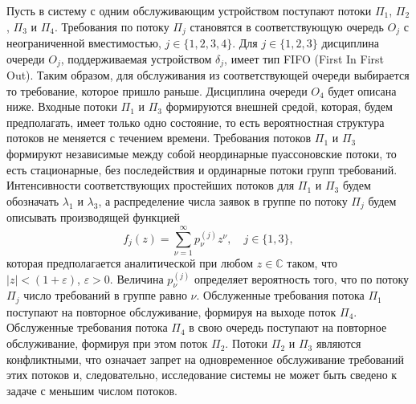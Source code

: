 \documentclass[a4paper,12pt,russian]{extarticle}
\begin{document}
Пусть в систему с одним обслуживающим устройством поступают потоки $\Pi_1$, $\Pi_2$, $\Pi_3$  и $\Pi_4$. Требования по потоку $\Pi_j$ становятся в соответствующую очередь $O_j$ с неограниченной вместимостью, $j\in \{1, 2, 3, 4\}$. Для $j \in \{1, 2, 3\}$ дисциплина очереди $O_j$, поддерживаемая устройством $\delta_j$, имеет тип FIFO (First In First Out). Таким образом, для обслуживания из соответствующей очереди выбирается то требование, которое пришло раньше. Дисциплина очереди $O_4$ будет описана ниже. Входные потоки $\Pi_1$ и $\Pi_3$ формируются внешней средой, которая, будем предполагать, имеет только одно состояние, то есть вероятностная структура потоков не меняется с течением времени. Требования потоков $\Pi_1$ и $\Pi_3$ формируют независимые между собой неординарные пуассоновские потоки, то есть  стационарные, без последействия и ординарные потоки групп требований. Интенсивности соответствующих простейших потоков для $\Pi_1$ и $\Pi_3$ будем обозначать $\lambda_1$ и $\lambda_3$, а распределение числа заявок в группе по потоку $\Pi_j$ будем описывать производящей функцией
\begin{equation}
f_j(z) = \sum_{\nu=1}^{\infty} p_{\nu}^{(j)} z ^{\nu}, \quad j\in \{1,3\},
\label{GeneratingFunc}
\end{equation}
которая предполагается аналитической при любом $z\in \mathbb{C}$ таком, что $|z|<(1+\varepsilon)$, $\varepsilon>0$. Величина $p_{\nu}^{(j)}$ определяет вероятность того, что по потоку $\Pi_j$ число требований в группе равно $\nu$. Обслуженные требования потока $\Pi_1$ поступают на повторное обслуживание, формируя на выходе поток $\Pi_4$. Обслуженные требования потока $\Pi_4$ в свою очередь поступают на повторное обслуживание, формируя при этом поток $\Pi_2$. Потоки $\Pi_2$ и $\Pi_3$ являются конфликтными, что означает запрет на одновременное обслуживание требований этих потоков и, следовательно, исследование системы не может быть сведено к задаче с меньшим числом потоков. 
\end{document}
